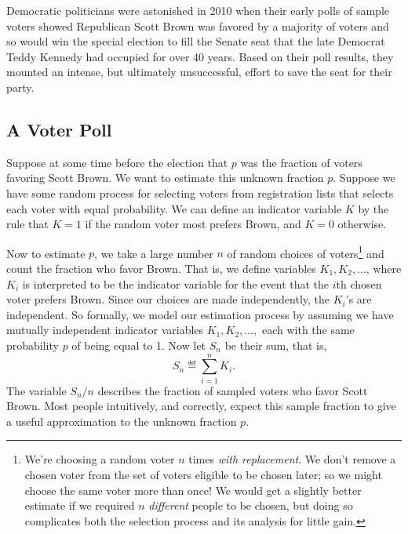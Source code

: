 Democratic politicians were astonished in 2010 when their early polls
of sample voters showed Republican Scott Brown was favored by a
majority of voters and so would win the special election to fill the
Senate seat that the late Democrat Teddy Kennedy had occupied for over
40 years.  Based on their poll results, they mounted an intense, but
ultimately unsuccessful, effort to save the seat for their party.

\iffalse
\footnote{We can only keep our fingers crossed for this race to happen --
when they ran against each other for the U.S. Senate in 2000, they
generated some of the best entertainment in TV history.}  \fi

\subsection{A Voter Poll}
\iffalse
How did polling give an advance estimate of the fraction of the
Massachusetts voters who favored Scott Brown over his Democratic
opponent?
\fi

Suppose at some time before the election that $p$ was the fraction of
voters favoring Scott Brown.  We want to estimate this unknown
fraction $p$.  Suppose we have some random process for selecting
voters from registration lists that selects each voter with equal
probability.  We can define an indicator variable $K$ by the rule
that $K=1$ if the random voter most prefers Brown, and $K=0$
otherwise.

Now to estimate $p$, we take a large number $n$ of random choices of
voters\footnote{We're choosing a random voter $n$ times \emph{with
    replacement}.  We don't remove a chosen voter from the set of
  voters eligible to be chosen later; so we might choose the same
  voter more than once!  We would get a slightly better estimate if we
  required $n$ \emph{different} people to be chosen, but doing so
  complicates both the selection process and its analysis for little
  gain.}  and count the fraction who favor Brown.  That is, we define
variables $K_1, K_2, \dots$, where $K_i$ is interpreted to be the
indicator variable for the event that the $i$th chosen voter prefers
Brown.  Since our choices are made independently, the $K_i$'s are
independent.  So formally, we model our estimation process by assuming
we have mutually independent indicator variables $K_1, K_2, \dots,$
each with the same probability $p$ of being equal to 1.  Now let
$S_n$ be their sum, that is,
\begin{equation}\label{LN12:Sn}
S_n \eqdef \sum_{i=1}^n K_i.
\end{equation}
The variable $S_n/n$ describes the fraction of sampled voters who
favor Scott Brown.  Most people intuitively, and correctly, expect this sample
fraction to give a useful approximation to the unknown fraction $p$.

